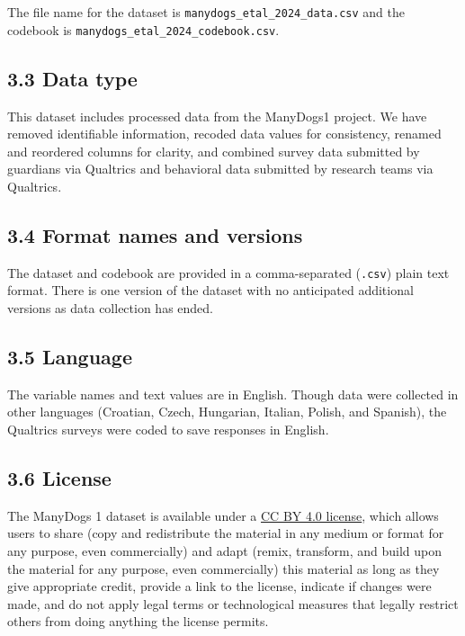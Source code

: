 \documentclass[
  pub,floatsintext]{apa6}
\begin{document}
The file name for the dataset is \texttt{manydogs\_etal\_2024\_data.csv} and the codebook is \texttt{manydogs\_etal\_2024\_codebook.csv}.

\hypertarget{data-type}{%
\subsection{3.3 Data type}\label{data-type}}

This dataset includes processed data from the ManyDogs1 project. We have removed identifiable information, recoded data values for consistency, renamed and reordered columns for clarity, and combined survey data submitted by guardians via Qualtrics and behavioral data submitted by research teams via Qualtrics.

\hypertarget{format-names-and-versions}{%
\subsection{3.4 Format names and versions}\label{format-names-and-versions}}

The dataset and codebook are provided in a comma-separated (\texttt{.csv}) plain text format. There is one version of the dataset with no anticipated additional versions as data collection has ended.

\hypertarget{language}{%
\subsection{3.5 Language}\label{language}}

The variable names and text values are in English. Though data were collected in other languages (Croatian, Czech, Hungarian, Italian, Polish, and Spanish), the Qualtrics surveys were coded to save responses in English.

\hypertarget{license}{%
\subsection{3.6 License}\label{license}}

The ManyDogs 1 dataset is available under a \href{https://creativecommons.org/licenses/by/4.0/}{CC BY 4.0 license}, which allows users to share (copy and redistribute the material in any medium or format for any purpose, even commercially) and adapt (remix, transform, and build upon the material for any purpose, even commercially) this material as long as they give appropriate credit, provide a link to the license, indicate if changes were made, and do not apply legal terms or technological measures that legally restrict others from doing anything the license permits.
\end{document}
